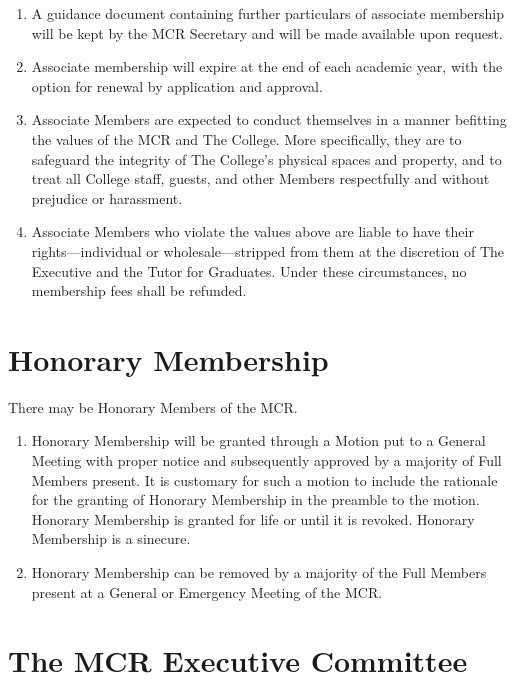 \documentclass[11pt, a4paper]{article}
\begin{document}
\begin{enumerate}
\begin{enumerate}
    \end{enumerate}
    \item A guidance document containing further particulars of associate membership will be kept by the MCR Secretary and will be made available upon request.
    \item Associate membership will expire at the end of each academic year, with the option for renewal by application and approval.
    \item Associate Members are expected to conduct themselves in a manner befitting the values of the MCR and The College. More specifically, they are to safeguard the integrity of The College's physical spaces and property, and to treat all College staff, guests, and other Members respectfully and without prejudice or harassment.
    \item Associate Members who violate the values above are liable to have their rights---individual or wholesale---stripped from them at the discretion of The Executive and the Tutor for Graduates. Under these circumstances, no membership fees shall be refunded.
\end{enumerate}





\section{Honorary Membership}
\label{sec:honorary_membership}

There may be Honorary Members of the MCR.

\begin{enumerate}

    \item Honorary Membership will be granted through a Motion put to a General Meeting with proper notice and subsequently approved by a majority of Full Members present. It is customary for such a motion to include the rationale for the granting of Honorary Membership in the preamble to the motion. Honorary Membership is granted for life or until it is revoked. Honorary Membership is a sinecure.
    \item Honorary Membership can be removed by a majority of the Full Members present at a General or Emergency Meeting of the MCR.
\end{enumerate}





\section{The MCR Executive Committee}
\label{sec:executive}
\end{document}
